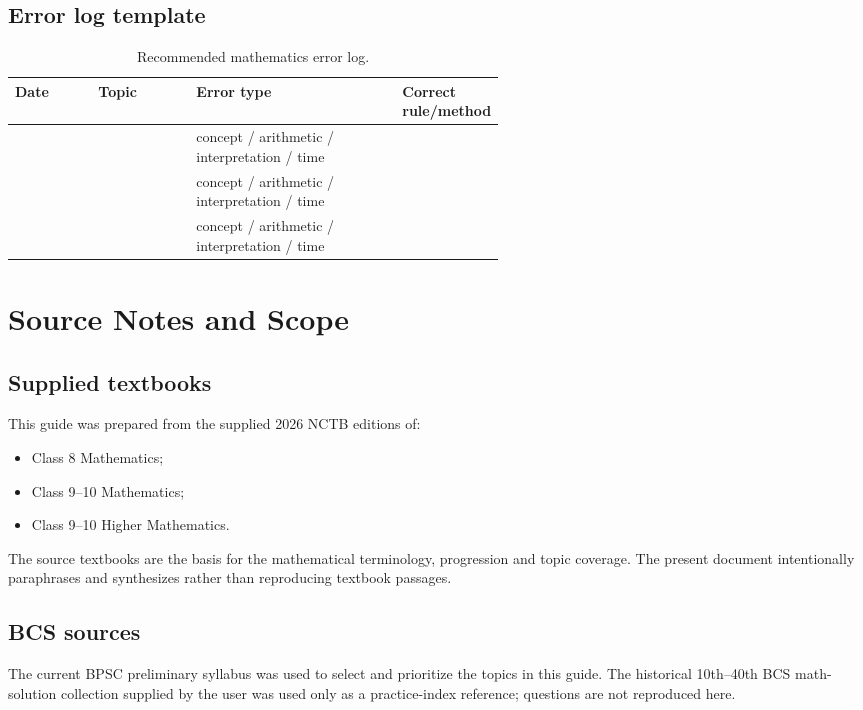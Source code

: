 \documentclass[12pt,a4paper,oneside]{book}
\begin{document}
\section{Error log template}
\begin{table}[htbp]
\centering
\caption{Recommended mathematics error log.}
\label{tab:error-log}
\begin{tabularx}{\linewidth}{@{}p{0.17\linewidth}p{0.2\linewidth}X p{0.2\linewidth}@{}}
\toprule
Date & Topic & Error type & Correct rule/method \\
\midrule
 & & concept / arithmetic / interpretation / time & \\
 & & concept / arithmetic / interpretation / time & \\
 & & concept / arithmetic / interpretation / time & \\
\bottomrule
\end{tabularx}
\end{table}

\backmatter
\chapter[Sources and Scope]{Source Notes and Scope}
\section{Supplied textbooks}
This guide was prepared from the supplied 2026 NCTB editions of:
\begin{itemize}
\item Class 8 Mathematics;
\item Class 9--10 Mathematics;
\item Class 9--10 Higher Mathematics.
\end{itemize}
The source textbooks are the basis for the mathematical terminology, progression and topic coverage. The present document intentionally paraphrases and synthesizes rather than reproducing textbook passages.

\section{BCS sources}
The current BPSC preliminary syllabus was used to select and prioritize the topics in this guide. The historical 10th--40th BCS math-solution collection supplied by the user was used only as a practice-index reference; questions are not reproduced here.
\end{document}
